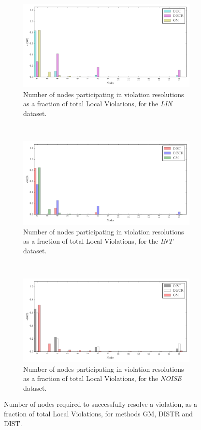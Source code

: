 \begin{figure}[!ht]\centering
\vspace{-0.5cm}
\begin{subfigure}{\textwidth}
	\centering
  \includegraphics[width=0.72\linewidth]{img/matchings_matchings_linear.pdf}
  \caption{Number of nodes participating in violation resolutions as a fraction of total Local Violations, for the \emph{LIN} dataset.}
\end{subfigure}\hfill\\[1.5em]
\begin{subfigure}{\textwidth}
\centering
  \includegraphics[width=0.72\linewidth]{img/matchings_matchings_interweaving.pdf}
  \caption{Number of nodes participating in violation resolutions as a fraction of total Local Violations, for the \emph{INT} dataset.}
\end{subfigure}\hfill\\[1.5em]
\begin{subfigure}{\textwidth}%
\centering
  \includegraphics[width=0.72\linewidth]{img/matchings_matchings_noisyinterweaving.pdf}
  \caption{Number of nodes participating in violation resolutions as a fraction of total Local Violations, for the \emph{NOISE} dataset.}
\end{subfigure}
\vspace{0.5cm}
\caption{Number of nodes required to successfully resolve a violation, as a fraction of total Local Violations, for methods GM, DISTR and DIST.} \label{fig:matchingComp-matchings}
\end{figure}

